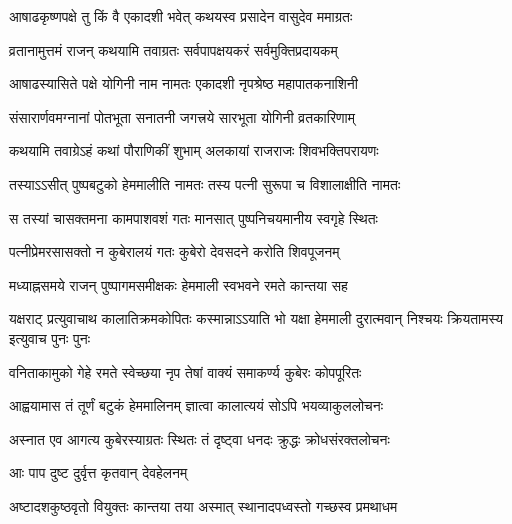 \label{sec:padma-ashadha-krishna-yogini}

\ganapatyadiDhyanam
\padmaPuranam



\twolineshloka
{आषाढकृष्णपक्षे तु किं वै एकादशी भवेत्}
{कथयस्व प्रसादेन वासुदेव ममाग्रतः}%


\twolineshloka
{व्रतानामुत्तमं राजन् कथयामि तवाग्रतः}
{सर्वपापक्षयकरं सर्वमुक्तिप्रदायकम्}%

\twolineshloka
{आषाढस्यासिते पक्षे योगिनी नाम नामतः}
{एकादशी नृपश्रेष्ठ महापातकनाशिनी}%

\twolineshloka
{संसारार्णवमग्नानां पोतभूता सनातनी}
{जगत्त्रये सारभूता योगिनी व्रतकारिणाम्}%

\twolineshloka
{कथयामि तवाग्रेऽहं कथां पौराणिकीं शुभाम्}
{अलकायां राजराजः शिवभक्तिपरायणः}%

\twolineshloka
{तस्याऽऽसीत् पुष्पबटुको हेममालीति नामतः}
{तस्य पत्नी सुरूपा च विशालाक्षीति नामतः}%

\twolineshloka
{स तस्यां चासक्तमना कामपाशवशं गतः}
{मानसात् पुष्पनिचयमानीय स्वगृहे स्थितः}%

\twolineshloka
{पत्नीप्रेमरसासक्तो न कुबेरालयं गतः}
{कुबेरो देवसदने करोति शिवपूजनम्}%

\twolineshloka
{मध्याह्नसमये राजन् पुष्पागमसमीक्षकः}
{हेममाली स्वभवने रमते कान्तया सह}%

\threelineshloka
{यक्षराट् प्रत्युवाचाथ कालातिक्रमकोपितः}
{कस्मान्नाऽऽयाति भो यक्षा हेममाली दुरात्मवान्}
{निश्चयः क्रियतामस्य इत्युवाच पुनः पुनः}%


\twolineshloka
{वनिताकामुको गेहे रमते स्वेच्छया नृप}
{तेषां वाक्यं समाकर्ण्य कुबेरः कोपपूरितः}%

\twolineshloka
{आह्वयामास तं तूर्णं बटुकं हेममालिनम्}
{ज्ञात्वा कालात्ययं सोऽपि भयव्याकुललोचनः}%

\twolineshloka
{अस्नात एव आगत्य कुबेरस्याग्रतः स्थितः}
{तं दृष्ट्वा धनदः क्रुद्धः क्रोधसंरक्तलोचनः}%

\onelineshloka
{आः पाप दुष्ट दुर्वृत्त कृतवान् देवहेलनम्}%

\twolineshloka
{अष्टादशकुष्ठवृतो वियुक्तः कान्तया तया}
{अस्मात् स्थानादपध्वस्तो गच्छस्व प्रमथाधम}%

